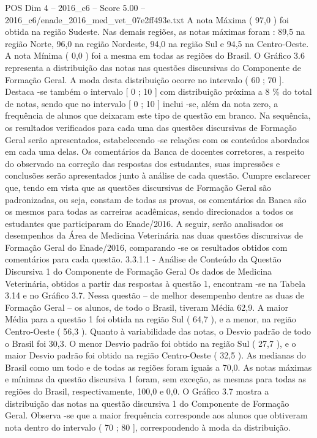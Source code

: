 \begin{textsample}{POS Dim 4 – 2016\_c6 – Score 5.00 – 2016\_c6/enade\_2016\_med\_vet\_07e2ff493e.txt}
A nota Máxima ( 97,0 ) foi obtida na região Sudeste.
Nas demais regiões, as notas máximas foram : 89,5 na região Norte, 96,0 na região Nordeste, 94,0 na região Sul e 94,5 na Centro-Oeste.
A nota Mínima ( 0,0 ) foi a mesma em todas as regiões do Brasil.
O Gráfico 3.6 representa a distribuição das notas nas questões discursivas do Componente de Formação Geral.
A moda desta distribuição ocorre no intervalo ( 60 ; 70 ].
Destaca -se também o intervalo [ 0 ; 10 ] com distribuição próxima a 8 \% do total de notas, sendo que no intervalo [ 0 ; 10 ] inclui -se, além da nota zero, a frequência de alunos que deixaram este tipo de questão em branco.
Na sequência, os resultados verificados para cada uma das questões discursivas de Formação Geral serão apresentados, estabelecendo -se relações com os conteúdos abordados em cada uma delas.
Os comentários da Banca de docentes corretores, a respeito do observado na correção das respostas dos estudantes, suas impressões e conclusões serão apresentados junto à análise de cada questão.
Cumpre esclarecer que, tendo em vista que as questões discursivas de Formação Geral são padronizadas, ou seja, constam de todas as provas, os comentários da Banca são os mesmos para todas as carreiras acadêmicas, sendo direcionados a todos os estudantes que participaram do Enade/2016.
A seguir, serão analisados os desempenhos da Área de Medicina Veterinária nas duas questões discursivas de Formação Geral do Enade/2016, comparando -se os resultados obtidos com comentários para cada questão. 3.3.1.1 - Análise de Conteúdo da Questão Discursiva 1 do Componente de Formação Geral Os dados de Medicina Veterinária, obtidos a partir das respostas à questão 1, encontram -se na Tabela 3.14 e no Gráfico 3.7.
Nessa questão – de melhor desempenho dentre as duas de Formação Geral – os alunos, de todo o Brasil, tiveram Média 62,9.
A maior Média para a questão 1 foi obtida na região Sul ( 64,7 ), e a menor, na região Centro-Oeste ( 56,3 ).
Quanto à variabilidade das notas, o Desvio padrão de todo o Brasil foi 30,3.
O menor Desvio padrão foi obtido na região Sul ( 27,7 ), e o maior Desvio padrão foi obtido na região Centro-Oeste ( 32,5 ).
As medianas do Brasil como um todo e de todas as regiões foram iguais a 70,0.
As notas máximas e mínimas da questão discursiva 1 foram, sem exceção, as mesmas para todas as regiões do Brasil, respectivamente, 100,0 e 0,0.
O Gráfico 3.7 mostra a distribuição das notas na questão discursiva 1 do Componente de Formação Geral.
Observa -se que a maior frequência corresponde aos alunos que obtiveram nota dentro do intervalo ( 70 ; 80 ], correspondendo à moda da distribuição.

\end{textsample}
